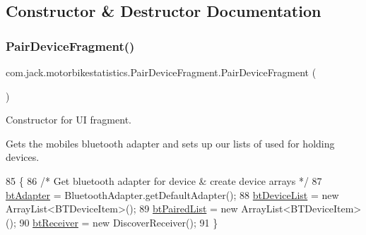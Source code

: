 \subsection{Constructor \& Destructor Documentation}
\mbox{\label{classcom_1_1jack_1_1motorbikestatistics_1_1_pair_device_fragment_a623b0f81d3d818bd816741bdccad6bd0}} 
\subsubsection{\texorpdfstring{Pair\+Device\+Fragment()}{PairDeviceFragment()}}
{\footnotesize\ttfamily com.\+jack.\+motorbikestatistics.\+Pair\+Device\+Fragment.\+Pair\+Device\+Fragment (\begin{DoxyParamCaption}{ }\end{DoxyParamCaption})\hspace{0.3cm}{\ttfamily [inline]}}



Constructor for UI fragment. 

Get\textquotesingle{}s the mobile\textquotesingle{}s bluetooth adapter and sets up our lists of used for holding devices. 
\begin{DoxyCode}
85     \{
86         \textcolor{comment}{/* Get bluetooth adapter for device & create device arrays */}
87         \hyperlink{classcom_1_1jack_1_1motorbikestatistics_1_1_pair_device_fragment_ac21b65a91245ae03ebba675e41166ace}{btAdapter} = BluetoothAdapter.getDefaultAdapter();
88         \hyperlink{classcom_1_1jack_1_1motorbikestatistics_1_1_pair_device_fragment_a422043a997fbe99ca9391440ce8b1180}{btDeviceList} = \textcolor{keyword}{new} ArrayList<BTDeviceItem>();
89         \hyperlink{classcom_1_1jack_1_1motorbikestatistics_1_1_pair_device_fragment_aace08948a2a397e9f724cfbf12256cfa}{btPairedList} = \textcolor{keyword}{new} ArrayList<BTDeviceItem>();
90         \hyperlink{classcom_1_1jack_1_1motorbikestatistics_1_1_pair_device_fragment_a6403005fa23383ae6a44576b83bd6681}{btReceiver} = \textcolor{keyword}{new} DiscoverReceiver();
91     \}
\end{DoxyCode}



